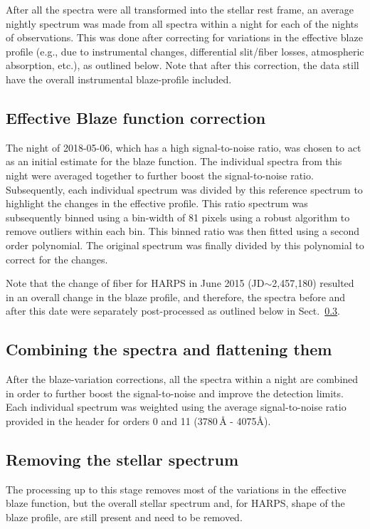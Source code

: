 \documentclass{aa}
\begin{document}
%
After all the spectra were all transformed into the stellar rest frame, an average nightly spectrum was made from all spectra within a night for each of the nights of observations. This was done after correcting for variations in the effective blaze profile (e.g., due to instrumental changes, differential slit/fiber losses, atmospheric absorption, etc.), as outlined below. Note that after this correction, the %
data still have the overall instrumental blaze-profile included.%

\subsection{Effective Blaze function correction}\label{sect:blaze}

The night of 2018-05-06, which has a high signal-to-noise ratio, was chosen to act as an initial estimate for the blaze function.%
The individual spectra from this night were averaged together to further boost the signal-to-noise ratio. Subsequently, each individual spectrum was divided by this reference spectrum to highlight the changes in the effective profile. This ratio spectrum was subsequently binned using a bin-width of 81 pixels using a robust algorithm to remove outliers within each bin. This binned ratio was then fitted using a second order polynomial. The original spectrum was finally divided by this polynomial to correct for the changes.

Note that the change of fiber for HARPS in June 2015 (JD$\sim$2,457,180) resulted in an overall change in the blaze profile, and therefore, the spectra before and after this date were separately post-processed as outlined below in Sect.~\ref{sect:starcor}.

\subsection{Combining the spectra and flattening them}\label{sect:comb}

After the blaze-variation corrections, all the spectra within a night are combined in order to further boost the signal-to-noise and improve the detection limits.
%
Each individual spectrum was weighted using the average signal-to-noise ratio provided in the header for orders 0 and 11 (3780\,\AA{} - 4075\AA).%

\subsection{Removing the stellar spectrum}\label{sect:starcor}
The processing up to this stage removes most of the variations in the effective blaze function, but the overall stellar spectrum and, for HARPS, shape of the blaze profile, are still present and need to be removed. 
\end{document}
